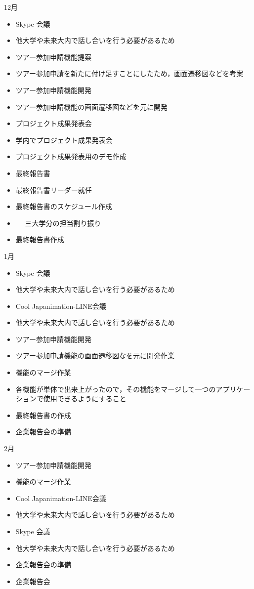 12月
\begin{itemize}
\item Skype 会議
\item   他大学や未来大内で話し合いを行う必要があるため
\item ツアー参加申請機能提案
\item    ツアー参加申請を新たに付け足すことにしたため，画面遷移図などを考案
\item ツアー参加申請機能開発
\item    ツアー参加申請機能の画面遷移図などを元に開発
\item プロジェクト成果発表会
\item    学内でプロジェクト成果発表会
\item    プロジェクト成果発表用のデモ作成
\item 最終報告書
\item   最終報告書リーダー就任
\item   最終報告書のスケジュール作成
\item　 三大学分の担当割り振り
\item   最終報告書作成
\end{itemize}

1月
\begin{itemize}
\item Skype 会議
\item   他大学や未来大内で話し合いを行う必要があるため
\item Cool Japanimation-LINE会議
\item   他大学や未来大内で話し合いを行う必要があるため
\item ツアー参加申請機能開発
\item   ツアー参加申請機能の画面遷移図なを元に開発作業
\item 機能のマージ作業
\item   各機能が単体で出来上がったので，その機能をマージして一つのアプリケーションで使用できるようにすること
\item 最終報告書の作成
\item 企業報告会の準備
\end{itemize}

2月
\begin{itemize}
\item ツアー参加申請機能開発
\item 機能のマージ作業
\item Cool Japanimation-LINE会議
\item   他大学や未来大内で話し合いを行う必要があるため
\item Skype 会議
\item   他大学や未来大内で話し合いを行う必要があるため
\item 企業報告会の準備
\item 企業報告会
\end{itemize}

